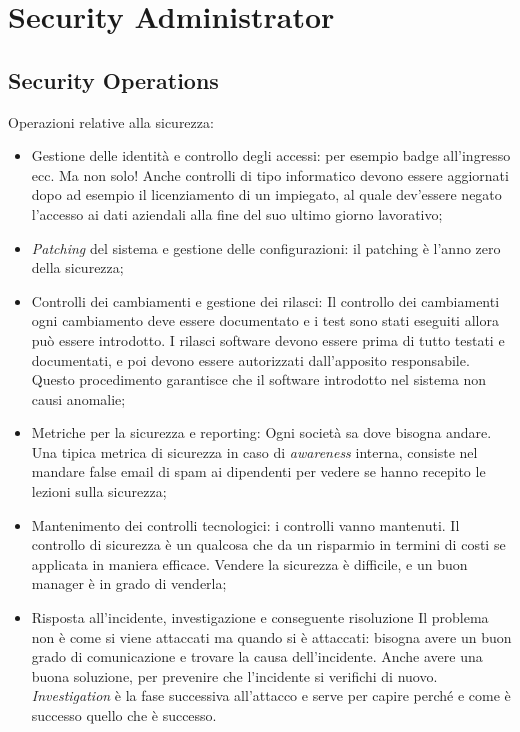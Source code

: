 
\chapter{Security Administrator}
\label{SA}

\section{Security Operations}
\label{SA:SO}

Operazioni relative alla sicurezza:
\begin{itemize}
\item Gestione delle identità e controllo degli accessi: per esempio badge 
all'ingresso ecc. Ma non solo! Anche controlli di tipo informatico devono
essere aggiornati dopo ad esempio il licenziamento di un impiegato, al quale
dev'essere negato l'accesso ai dati aziendali alla fine del suo ultimo giorno
lavorativo;
\item \textit{Patching} del sistema e gestione delle configurazioni: il
patching è l'anno zero della sicurezza;
\item Controlli dei cambiamenti e gestione dei rilasci: Il controllo dei 
cambiamenti ogni cambiamento deve essere documentato e i test sono stati 
eseguiti allora può essere introdotto.
I rilasci software devono essere prima di tutto testati e documentati, e poi
devono essere autorizzati dall'apposito responsabile. Questo procedimento
garantisce che il software introdotto nel sistema non causi anomalie;
\item Metriche per la sicurezza e reporting: Ogni società sa dove bisogna 
andare. Una tipica metrica di sicurezza in caso di \emph{awareness} interna,
consiste nel mandare false email di spam ai dipendenti per vedere se
hanno recepito le lezioni sulla sicurezza;
\item Mantenimento dei controlli tecnologici: i controlli vanno mantenuti. 
Il controllo di sicurezza è un qualcosa che da un risparmio in termini di costi 
se applicata in maniera efficace. Vendere la sicurezza è difficile, e un buon 
manager è in grado di venderla;

\item Risposta all'incidente, investigazione e conseguente risoluzione
Il problema non è come si viene attaccati ma quando si è attaccati: bisogna 
avere un buon grado di comunicazione e trovare la causa dell'incidente. Anche 
avere una buona soluzione, per prevenire che l'incidente si verifichi di nuovo.
\textit{Investigation} è la fase successiva all'attacco e serve per capire 
perché e come è successo quello che è successo.

\end{itemize}


